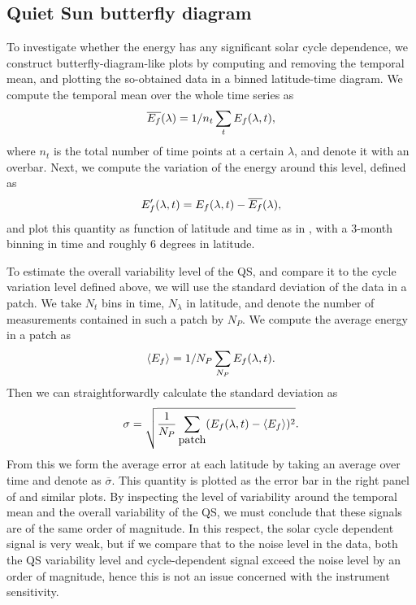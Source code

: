\documentclass{aa}
\begin{document}


\subsection{Quiet Sun \fff butterfly diagram}\label{qsf}

To investigate whether the \fff energy has any significant solar cycle dependence, we construct butterfly-diagram-like plots by computing and removing the temporal mean, and plotting the so-obtained data in a binned latitude-time diagram. 
We compute the temporal mean over the whole time series as 
\begin{equation}
    \overline{E_f}(\lambda) = 1/n_t \sum_t E_f(\lambda,t),
\end{equation}
where $n_t$ is the total number of time points at a certain $\lambda$, and denote it with an overbar. Next, we compute the variation of the \fff energy around this level, defined as
\begin{equation}
    E_f'(\lambda,t)=E_f(\lambda,t)-\overline{E_f}(\lambda),
\end{equation}
and plot this quantity as function of latitude and time as in , with a 3-month binning in time and roughly 6 degrees in latitude. 

To estimate 
the overall variability level of the QS, and compare it to the cycle variation level defined above,
we will use the standard deviation of the data in a patch.
We take $N_t$ bins in time, $N_\lambda$ in latitude, and denote the number of \ef measurements contained in such a patch by $N_P$. We compute the average \fff energy in a patch as
\begin{equation}
\langle E_f \rangle=1/N_P \sum_{N_P} E_f (\lambda,t).
\end{equation}
Then we can straightforwardly calculate the standard deviation as
\begin{equation}
\sigma= \sqrt{\frac{1}{N_P}\sum_{\mbox{patch}} ( E_f(\lambda,t)
- \left<{E_f} \right>)^2}.
\end{equation}
From this we form the average error at each latitude by taking an average over time and denote as $\overline{\sigma}$. 
This quantity is plotted as the error bar in the right panel of  and similar plots.
By inspecting the level of variability around the temporal mean and the 
overall variability of the QS, we must conclude that these signals are of the same order of magnitude. 
In this respect, the solar cycle dependent signal is very weak, but if we compare that to the noise level in the data, both the QS variability level and cycle-dependent signal exceed the noise level by an order of magnitude, hence this is not an issue concerned with the instrument sensitivity.
\end{document}
